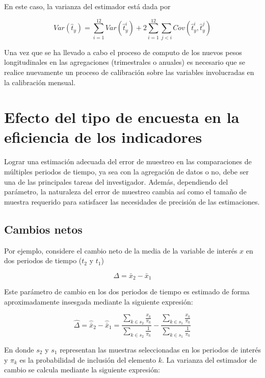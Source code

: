 \documentclass[
  12pt,
  spanish,
]{book}
\begin{document}
En este caso, la varianza del estimador está dada por

\[
Var(\hat{t}_y) 
= \sum_{i=1}^{12} Var(\hat{t}_{y}^i)
+ 2 \sum_{i=1}^{12} \sum_{j < i} Cov(\hat{t}_{y}^i, \hat{t}_{y}^j)
\]

Una vez que se ha llevado a cabo el proceso de computo de los nuevos pesos longitudinales en las agregaciones (trimestrales o anuales) es necesario que se realice nuevamente un proceso de calibración sobre las variables involucradas en la calibración mensual.

\hypertarget{efecto-del-tipo-de-encuesta-en-la-eficiencia-de-los-indicadores}{%
\section{Efecto del tipo de encuesta en la eficiencia de los indicadores}\label{efecto-del-tipo-de-encuesta-en-la-eficiencia-de-los-indicadores}}

Lograr una estimación adecuada del error de muestreo en las comparaciones de múltiples periodos de tiempo, ya sea con la agregación de datos o no, debe ser una de las principales tareas del investigador. Además, dependiendo del parámetro, la naturaleza del error de muestreo cambia así como el tamaño de muestra requerido para satisfacer las necesidades de precisión de las estimaciones.

\hypertarget{cambios-netos}{%
\subsection*{Cambios netos}\label{cambios-netos}}

Por ejemplo, considere el cambio neto de la media de la variable de interés \(x\) en dos periodos de tiempo (\(t_2\) y \(t_1\))

\[
\Delta = \bar{x}_2 - \bar{x}_1
\]

Este parámetro de cambio en los dos periodos de tiempo es estimado de forma aproximadamente insesgada mediante la siguiente expresión:

\[
\hat{\Delta} = \hat{\bar{x}}_2 - \hat{\bar{x}}_1
= \frac{\sum_{k\in s_2}\frac{x_{k}}{\pi_k}}{\sum_{k\in s_2}\frac{1}{\pi_k}} - \frac{\sum_{k\in s_1}\frac{x_{k}}{\pi_k}}{\sum_{k\in s_1}\frac{1}{\pi_k}} 
\]

En donde \(s_2\) y \(s_1\) representan las muestras seleccionadas en los periodos de interés y \(\pi_k\) es la probabilidad de inclusión del elemento \(k\). La varianza del estimador de cambio se calcula mediante la siguiente expresión:
\end{document}
